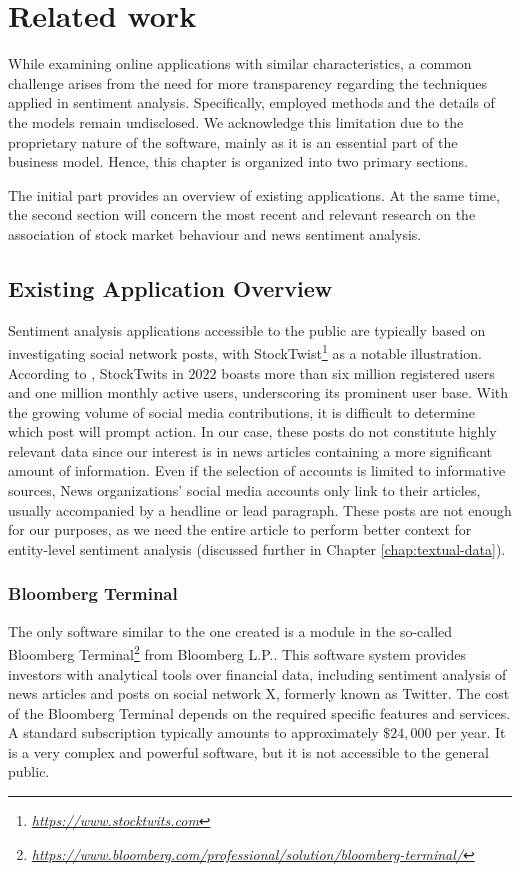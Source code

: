 \chapter{Related work}
\label{chap:related-work}
While examining online applications with similar characteristics, a common challenge arises from the need for more transparency regarding the techniques applied in sentiment analysis. Specifically, employed methods and the details of the models remain undisclosed. We acknowledge this limitation due to the proprietary nature of the software, mainly as it is an essential part of the business model. Hence, this chapter is organized into two primary sections. 

The initial part provides an overview of existing applications. At the same time, the second section will concern the most recent and relevant research on the association of stock market behaviour and news sentiment analysis.

\section{Existing Application Overview}
\label{sec:existing-application-overview}
Sentiment analysis applications accessible to the public are typically based on investigating social network posts, with StockTwist\footnote{\href{https://www.stocktwits.com}{\textit{https://www.stocktwits.com}}} as a notable illustration. According to \parencite{reuters2022}, StockTwits in $2022$ boasts more than six million registered users and one million monthly active users, underscoring its prominent user base. With the growing volume of social media contributions, it is difficult to determine which post will prompt action. In our case, these posts do not constitute highly relevant data since our interest is in news articles containing a more significant amount of information. Even if the selection of accounts is limited to informative sources, News organizations' social media accounts only link to their articles, usually accompanied by a headline or lead paragraph. These posts are not enough for our purposes, as we need the entire article to perform better context for entity-level sentiment analysis (discussed further in Chapter \ref{chap:textual-data}).

\subsection{Bloomberg Terminal}
\label{subsec:bloomberg-terminal}
The only software similar to the one created is a module in the so-called Bloomberg Terminal\footnote{\href{https://www.bloomberg.com/professional/solution/bloomberg-terminal/}{\textit{https://www.bloomberg.com/professional/solution/bloomberg-terminal/}}} from Bloomberg L.P.. This software system provides investors with analytical tools over financial data, including sentiment analysis of news articles and posts on social network X, formerly known as Twitter. The cost of the Bloomberg Terminal depends on the required specific features and services. \linebreak A standard subscription typically amounts to approximately $\$24,000$ per year. It is a very complex and powerful software, but it is not accessible to the general public.

